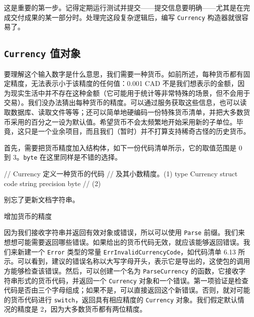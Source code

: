 这是重要的第一步。记得定期运行测试并提交——提交信息要明确——尤其是在完成交付成果的某一部分时。处理完这段复杂逻辑后，编写 \texttt{Currency} 构造器就很容易了。

\subsection{\texttt{Currency} 值对象}

要理解这个输入数字是什么意思，我们需要一种货币。如前所述，每种货币都有固定精度，无法表示小于该精度的任何值：0.001 CAD 不是我们想表示的金额，因为现实生活中并不存在这种金额（它可能用于统计等非常特殊的场景，但不会用于交易）。我们没办法猜出每种货币的精度。可以通过服务获取这些信息，也可以读取数据库、读取文件等等；还可以简单地硬编码一份特殊货币清单，并把大多数货币采用的百分之一设为默认值。希望货币不会太频繁地开始采用新的子单位。毕竟，这只是一个业余项目，而且我们（暂时）并不打算支持稀奇古怪的历史货币。

首先，需要把货币精度加入结构体，如下一份代码清单所示，它的取值范围是 0 到 3。\texttt{byte} 在这里同样是不错的选择。

\begin{gocode}[title={代码清单 6.12 \texttt{currency.go}：增加精度}]
// Currency 定义一种货币的代码
// 及其小数精度。(1)
type Currency struct {
    code      string
    precision byte // (2)
}
\end{gocode}

\begin{codeannotations}
\item 别忘了更新文档字符串。
\item 增加货币的精度
\end{codeannotations}

因为我们接收字符串并返回有效对象或错误，所以可以使用 \texttt{Parse} 前缀。我们来想想可能需要返回哪些错误。如果给出的货币代码无效，就应该能够返回错误。我们来新建一个 \texttt{Error} 类型的常量 \texttt{ErrInvalidCurrencyCode}，如代码清单 6.13 所示。可以看到，建议的错误名称以大写字母开头，表示它是导出的，这使包的调用方能够检查该错误。然后，可以创建一个名为 \texttt{ParseCurrency} 的函数，它接收字符串形式的货币代码，并返回一个 \texttt{Currency} 对象和一个错误。第一项验证是检查代码是否由三个字母组成；如果不是，可以直接返回这个新错误。否则，就对可能的货币代码进行 \texttt{switch}，返回具有相应精度的 \texttt{Currency} 对象。我们假定默认情况的精度是 2，因为大多数货币都有两位精度。

